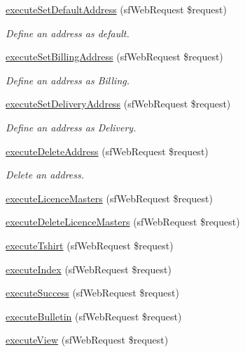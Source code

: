 \begin{DoxyCompactItemize}
\hyperlink{classuser_actions_abb36efdd0721f24733bb9f64ff56556e}{execute\-Set\-Default\-Address} (sf\-Web\-Request \$request)
\begin{DoxyCompactList}\small\item\em Define an address as default. \end{DoxyCompactList}\item 
\hyperlink{classuser_actions_a1341c2162d580cebdee2fc82180e9d34}{execute\-Set\-Billing\-Address} (sf\-Web\-Request \$request)
\begin{DoxyCompactList}\small\item\em Define an address as Billing. \end{DoxyCompactList}\item 
\hyperlink{classuser_actions_afa6bdc58fe3be9344d32a71c379775ed}{execute\-Set\-Delivery\-Address} (sf\-Web\-Request \$request)
\begin{DoxyCompactList}\small\item\em Define an address as Delivery. \end{DoxyCompactList}\item 
\hyperlink{classuser_actions_a01008d70f2fce436ea2f68b52bc940dc}{execute\-Delete\-Address} (sf\-Web\-Request \$request)
\begin{DoxyCompactList}\small\item\em Delete an address. \end{DoxyCompactList}\item 
\hyperlink{classuser_actions_a14545bfea5c62afaf31b7d34bb41e859}{execute\-Licence\-Masters} (sf\-Web\-Request \$request)
\item 
\hyperlink{classuser_actions_ae21eb73e8c98a81c116c8711e1a8790a}{execute\-Delete\-Licence\-Masters} (sf\-Web\-Request \$request)
\item 
\hyperlink{classuser_actions_ad36bec308b42a73a066e18de84e26971}{execute\-Tshirt} (sf\-Web\-Request \$request)
\item 
\hyperlink{classuser_actions_a948cc911eb1d9f77990be54af3b2080f}{execute\-Index} (sf\-Web\-Request \$request)
\item 
\hyperlink{classuser_actions_a7ceef17bbb671c645c6f964d1cdc51a3}{execute\-Success} (sf\-Web\-Request \$request)
\item 
\hyperlink{classuser_actions_abfdc0f565591bc7c38a3754ac5e090a8}{execute\-Bulletin} (sf\-Web\-Request \$request)
\item 
\hyperlink{classuser_actions_ad61d212fa3f7e8cb4190700a8a670606}{execute\-View} (sf\-Web\-Request \$request)
\item 

\end{DoxyCompactItemize}
